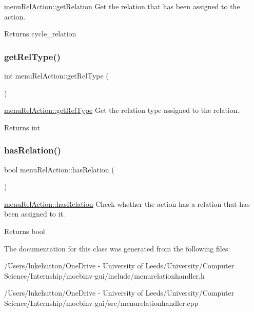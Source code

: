 \mbox{\hyperlink{classmenu_rel_action_a34deae132c511b7e34af97585df9245c}{menu\+Rel\+Action\+::get\+Relation}} Get the relation that has been assigned to the action. 

\begin{DoxyReturn}{Returns}
cycle\+\_\+relation 
\end{DoxyReturn}
\mbox{\label{classmenu_rel_action_a1092ced0a224fdb4c8f5a0b12548a120}} 
\subsubsection{\texorpdfstring{get\+Rel\+Type()}{getRelType()}}
{\footnotesize\ttfamily int menu\+Rel\+Action\+::get\+Rel\+Type (\begin{DoxyParamCaption}{ }\end{DoxyParamCaption})}



\mbox{\hyperlink{classmenu_rel_action_a1092ced0a224fdb4c8f5a0b12548a120}{menu\+Rel\+Action\+::get\+Rel\+Type}} Get the relation type assigned to the relation. 

\begin{DoxyReturn}{Returns}
int 
\end{DoxyReturn}
\mbox{\label{classmenu_rel_action_a5e6339dbaf4cf0dc9543afdfc5b9e15a}} 
\subsubsection{\texorpdfstring{has\+Relation()}{hasRelation()}}
{\footnotesize\ttfamily bool menu\+Rel\+Action\+::has\+Relation (\begin{DoxyParamCaption}{ }\end{DoxyParamCaption})}



\mbox{\hyperlink{classmenu_rel_action_a5e6339dbaf4cf0dc9543afdfc5b9e15a}{menu\+Rel\+Action\+::has\+Relation}} Check whether the action has a relation that has been assigned to it. 

\begin{DoxyReturn}{Returns}
bool 
\end{DoxyReturn}


The documentation for this class was generated from the following files\+:\begin{DoxyCompactItemize}
\item 
/\+Users/lukehutton/\+One\+Drive -\/ University of Leeds/\+University/\+Computer Science/\+Internship/moebinv-\/gui/include/menurelationhandler.\+h\item 
/\+Users/lukehutton/\+One\+Drive -\/ University of Leeds/\+University/\+Computer Science/\+Internship/moebinv-\/gui/src/menurelationhandler.\+cpp\end{DoxyCompactItemize}

